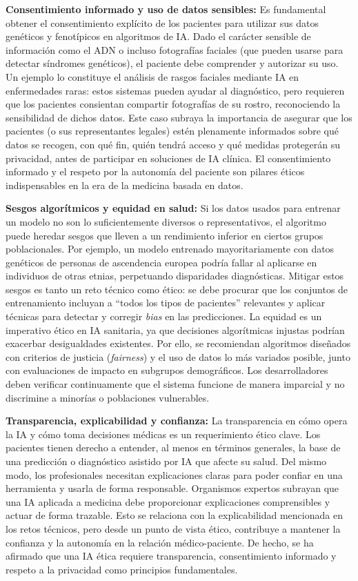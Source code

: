\documentclass[11pt,a4paper,spanish]{book}
\numberwithin{equation}{chapter}
\numberwithin{figure}{chapter}
\begin{document}
\textbf{Consentimiento informado y uso de datos sensibles:} Es fundamental obtener el consentimiento explícito de los pacientes para utilizar sus datos genéticos y fenotípicos en algoritmos de IA. Dado el carácter sensible de información como el ADN o incluso fotografías faciales (que pueden usarse para detectar síndromes genéticos), el paciente debe comprender y autorizar su uso. Un ejemplo lo constituye el análisis de rasgos faciales mediante IA en enfermedades raras: estos sistemas pueden ayudar al diagnóstico, pero requieren que los pacientes consientan compartir fotografías de su rostro, reconociendo la sensibilidad de dichos datos. Este caso subraya la importancia de asegurar que los pacientes (o sus representantes legales) estén plenamente informados sobre qué datos se recogen, con qué fin, quién tendrá acceso y qué medidas protegerán su privacidad, antes de participar en soluciones de IA clínica. El consentimiento informado y el respeto por la autonomía del paciente son pilares éticos indispensables en la era de la medicina basada en datos\cite{pranav_ia}.

\textbf{Sesgos algorítmicos y equidad en salud:} Si los datos usados para entrenar un modelo no son lo suficientemente diversos o representativos, el algoritmo puede heredar sesgos que lleven a un rendimiento inferior en ciertos grupos poblacionales. Por ejemplo, un modelo entrenado mayoritariamente con datos genéticos de personas de ascendencia europea podría fallar al aplicarse en individuos de otras etnias, perpetuando disparidades diagnósticas. Mitigar estos sesgos es tanto un reto técnico como ético: se debe procurar que los conjuntos de entrenamiento incluyan a ``todos los tipos de pacientes'' relevantes y aplicar técnicas para detectar y corregir \textit{bias} en las predicciones. La equidad es un imperativo ético en IA sanitaria, ya que decisiones algorítmicas injustas podrían exacerbar desigualdades existentes. Por ello, se recomiendan algoritmos diseñados con criterios de justicia (\textit{fairness}) y el uso de datos lo más variados posible, junto con evaluaciones de impacto en subgrupos demográficos. Los desarrolladores deben verificar continuamente que el sistema funcione de manera imparcial y no discrimine a minorías o poblaciones vulnerables.

\textbf{Transparencia, explicabilidad y confianza:} La transparencia en cómo opera la IA y cómo toma decisiones médicas es un requerimiento ético clave. Los pacientes tienen derecho a entender, al menos en términos generales, la base de una predicción o diagnóstico asistido por IA que afecte su salud. Del mismo modo, los profesionales necesitan explicaciones claras para poder confiar en una herramienta y usarla de forma responsable. Organismos expertos subrayan que una IA aplicada a medicina debe proporcionar explicaciones comprensibles y actuar de forma trazable.
Esto se relaciona con la explicabilidad mencionada en los retos técnicos, pero desde un punto de vista ético, contribuye a mantener la confianza y la autonomía en la relación médico-paciente. De hecho, se ha afirmado que una IA ética requiere transparencia, consentimiento informado y respeto a la privacidad como principios fundamentales\cite{pranav_ia,rajkomar_2019,Ching_2018}. 
\end{document}
